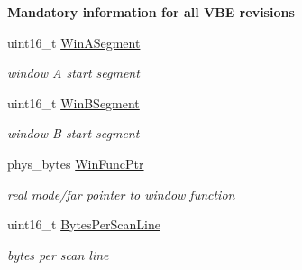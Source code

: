 \begin{Indent}{\bf Mandatory information for all V\+BE revisions}
\begin{DoxyCompactItemize}
uint16\+\_\+t \hyperlink{structvbe__mode__info__t_a99b747099fd4d4271b0f0bc29f31c48f}{Win\+A\+Segment}
\begin{DoxyCompactList}\small\item\em window A start segment \end{DoxyCompactList}\item 
uint16\+\_\+t \hyperlink{structvbe__mode__info__t_a9edf422a931df7c7a1d5f82afb911566}{Win\+B\+Segment}
\begin{DoxyCompactList}\small\item\em window B start segment \end{DoxyCompactList}\item 
phys\+\_\+bytes \hyperlink{structvbe__mode__info__t_affd250a4766543099f253e27af3abc35}{Win\+Func\+Ptr}
\begin{DoxyCompactList}\small\item\em real mode/far pointer to window function \end{DoxyCompactList}\item 
uint16\+\_\+t \hyperlink{structvbe__mode__info__t_afe40654a51bf4a12a8b376ff3506688e}{Bytes\+Per\+Scan\+Line}
\begin{DoxyCompactList}\small\item\em bytes per scan line \end{DoxyCompactList}\end{DoxyCompactItemize}
\end{Indent}
